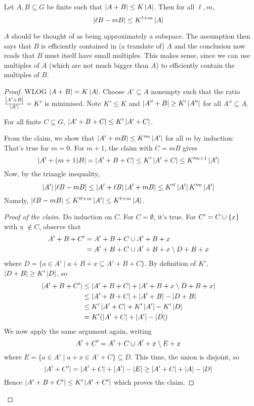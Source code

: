 \documentclass{article}
\begin{document}
\begin{thm}
  Let $A, B \subseteq G$ be finite such that $\left\lvert A + B\right\rvert \le K\left\lvert A\right\rvert$. Then for all $\ell, m$,
  $$\left\lvert \ell B - mB\right\rvert \le K^{\ell + m}\left\lvert A\right\rvert$$
\end{thm}
\begin{idea}
  $A$ should be thought of as being approximately a subspace. The assumption then says that $B$ is efficiently contained in (a translate of) $A$ and the conclusion now reads that $B$ must itself have small multiples. This makes sense, since we can use multiples of $A$ (which are not much bigger than $A$) to efficiently contain the multiples of $B$.
\end{idea}
\begin{proof}
  WLOG $\left\lvert A + B\right\rvert = K\left\lvert A\right\rvert$. Choose $A' \subseteq A$ nonempty such that the ratio $\frac{\left\lvert A' + B\right\rvert}{\left\lvert A'\right\rvert} = K'$ is minimised. Note $K' \le K$ and $\left\lvert A'' + B\right\rvert \ge K'\left\lvert A''\right\rvert$ for all $A'' \subseteq A$.
  \begin{claim}
    For all finite $C \subseteq G$, $\left\lvert A' + B + C\right\rvert \le K'\left\lvert A' + C\right\rvert$.
  \end{claim}
  From the claim, we show that $\left\lvert A' + mB\right\rvert \le K'^m\left\lvert A'\right\rvert$ for all $m$ by induction:
  That's true for $m = 0$. For $m + 1$, the claim with $C = mB$ gives
  $$\left\lvert A' + (m + 1)B\right\rvert = \left\lvert A' + B + C\right\rvert \le K'\left\lvert A' + C\right\rvert \le K'^{m + 1}\left\lvert A'\right\rvert$$
  Now, by the triangle inequality,
  $$\left\lvert A'\right\rvert\left\lvert \ell B - mB\right\rvert \le \left\lvert A' + \ell B\right\rvert\left\lvert A' + mB\right\rvert \le K'^\ell \left\lvert A'\right\rvert K'^m \left\lvert A'\right\rvert$$
  Namely, $\left\lvert \ell B - mB\right\rvert \le K'^{\ell + m}\left\lvert A'\right\rvert \le K^{\ell + m} \left\lvert A\right\rvert$.
  \begin{proof}[Proof of the claim]
    Do induction on $C$. For $C = \emptyset$, it's true. For $C' = C \cup \{x\}$ with x $\notin C$, observe that
    \begin{align*}
      A' + B + C'
      & = A' + B + C \cup A' + B + x \\
      & = A' + B + C \cup A' + B + x \setminus D + B + x
    \end{align*}
    where $D = \{a \in A' \mid a + B + x \subseteq A' + B + C\}$. By definition of $K'$, $\left\lvert D + B\right\rvert \ge K'\left\lvert D\right\rvert$, so
    \begin{align*}
      \left\lvert A' + B + C'\right\rvert
      & \le \left\lvert A' + B + C\right\rvert + \left\lvert A' + B + x \setminus D + B + x\right\rvert \\
      & \le \left\lvert A' + B + C\right\rvert + \left\lvert A' + B\right\rvert - \left\lvert D + B\right\rvert \\
      & \le K'\left\lvert A' + C\right\rvert + K'\left\lvert A'\right\rvert - K'\left\lvert D\right\rvert \\
      & = K'(\left\lvert A' + C\right\rvert + \left\lvert A'\right\rvert - \left\lvert D\right\rvert)
    \end{align*}
    We now apply the same argument again, writing
    $$A' + C' = A' + C \cup A' + x \setminus E + x$$
    where $E = \{a \in A' \mid a + x \in A' + C\} \subseteq D$. This time, the union is disjoint, so
    $$\left\lvert A '+ C'\right\rvert = \left\lvert A' + C\right\rvert + \left\lvert A'\right\rvert - \left\lvert E\right\rvert \ge \left\lvert A' + C\right\rvert + \left\lvert A\right\rvert - \left\lvert D\right\rvert$$
    Hence $\left\lvert A' + B + C'\right\rvert \le K'\left\lvert A' + C'\right\rvert$ which proves the claim.
  \end{proof}
\end{proof}
\end{document}
